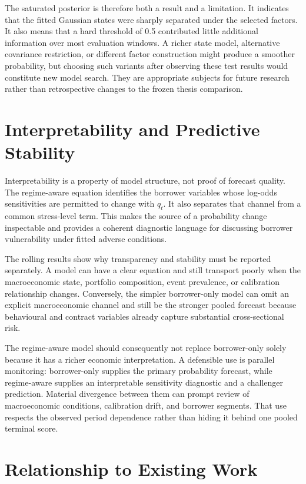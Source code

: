 The saturated posterior is therefore both a result and a limitation. It indicates that the fitted Gaussian states were sharply separated under the selected factors. It also means that a hard threshold of 0.5 contributed little additional information over most evaluation windows. A richer state model, alternative covariance restriction, or different factor construction might produce a smoother probability, but choosing such variants after observing these test results would constitute new model search. They are appropriate subjects for future research rather than retrospective changes to the frozen thesis comparison.

\section{Interpretability and Predictive Stability}

Interpretability is a property of model structure, not proof of forecast quality. The regime-aware equation identifies the borrower variables whose log-odds sensitivities are permitted to change with $q_t$. It also separates that channel from a common stress-level term. This makes the source of a probability change inspectable and provides a coherent diagnostic language for discussing borrower vulnerability under fitted adverse conditions.

The rolling results show why transparency and stability must be reported separately. A model can have a clear equation and still transport poorly when the macroeconomic state, portfolio composition, event prevalence, or calibration relationship changes. Conversely, the simpler borrower-only model can omit an explicit macroeconomic channel and still be the stronger pooled forecast because behavioural and contract variables already capture substantial cross-sectional risk.

The regime-aware model should consequently not replace borrower-only solely because it has a richer economic interpretation. A defensible use is parallel monitoring: borrower-only supplies the primary probability forecast, while regime-aware supplies an interpretable sensitivity diagnostic and a challenger prediction. Material divergence between them can prompt review of macroeconomic conditions, calibration drift, and borrower segments. That use respects the observed period dependence rather than hiding it behind one pooled terminal score.

\section{Relationship to Existing Work}


